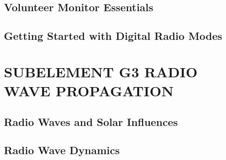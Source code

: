 \documentclass[12pt]{book}
\begin{document}
\section{Volunteer Monitor Essentials}











\section{Getting Started with Digital Radio Modes}















\chapter{SUBELEMENT G3  RADIO WAVE PROPAGATION}
\section{Radio Waves and Solar Influences}














\section{Radio Wave Dynamics}












\end{document}
